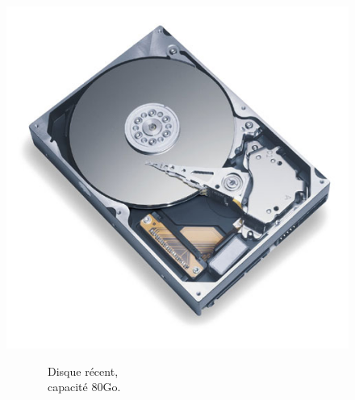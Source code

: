 \begin{frame}
  \frametitle{\insertsubsection}
  \begin{multicols}{2}
    \begin{minipage}[t]{1.4\linewidth}
    \vspace{-1cm}
      \begin{figure}
        \includegraphics[width=1\linewidth]{fig3/DiamondMax-80GB-Internal-Hard-disk.png}
      \end{figure}
    \end{minipage}
    \hspace{2cm}
    \begin{minipage}[t]{\linewidth}
      \vspace{2cm}
    \center ~~~~~~~~~~~~~Disque récent,\\ 
     ~~~~~~~~~~~~~capacité 80Go. 
    \end{minipage}
  \end{multicols}
\end{frame}

